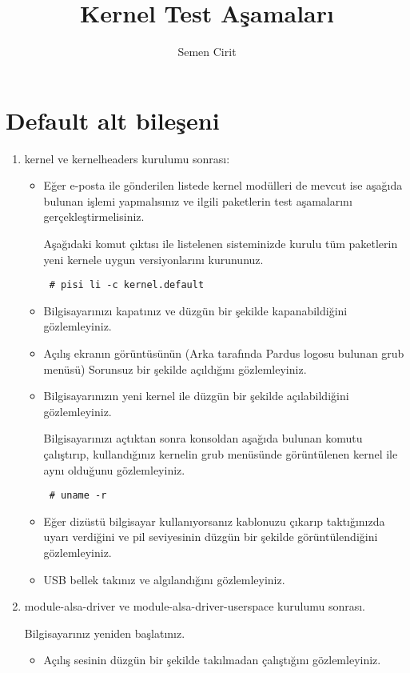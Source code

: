 \documentclass[a4paper,10pt]{article}
\title{Kernel Test Aşamaları}
\author{Semen Cirit}
\begin{document}
\maketitle

\section{Default alt bileşeni}
\begin{enumerate}

 \item kernel ve kernelheaders kurulumu sonrası:

\begin{itemize}
\item Eğer e-posta ile gönderilen listede kernel modülleri de mevcut ise aşağıda bulunan işlemi yapmalısınız ve ilgili paketlerin test aşamalarını gerçekleştirmelisiniz.

Aşağıdaki komut çıktısı ile listelenen sisteminizde kurulu tüm paketlerin yeni kernele uygun versiyonlarını kurununuz.
\begin{verbatim}
 # pisi li -c kernel.default
\end{verbatim}

\item Bilgisayarınızı kapatınız ve düzgün bir şekilde kapanabildiğini gözlemleyiniz.
\item Açılış ekranın görüntüsünün (Arka tarafında Pardus logosu bulunan grub menüsü) Sorunsuz bir şekilde açıldığını gözlemleyiniz.
\item Bilgisayarınızın yeni kernel ile düzgün bir şekilde açılabildiğini gözlemleyiniz.

Bilgisayarınızı açtıktan sonra konsoldan aşağıda bulunan komutu çalıştırıp, kullandığınız kernelin grub menüsünde görüntülenen kernel ile aynı olduğunu gözlemleyiniz.
\begin{verbatim}
 # uname -r 
\end{verbatim}

\item Eğer dizüstü bilgisayar kullanıyorsanız kablonuzu çıkarıp taktığınızda uyarı verdiğini ve pil seviyesinin düzgün bir şekilde görüntülendiğini gözlemleyiniz.
\item USB bellek takınız ve algılandığını gözlemleyiniz.
\end{itemize}

\item module-alsa-driver ve module-alsa-driver-userspace kurulumu sonrası.

Bilgisayarınız yeniden başlatınız.
\begin{itemize}
\item Açılış sesinin düzgün bir şekilde takılmadan çalıştığını gözlemleyiniz.


\end{itemize}
\end{enumerate}
\end{document}
